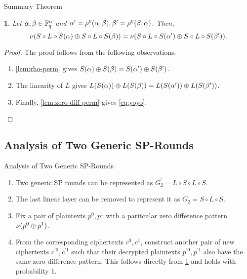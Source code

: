\documentclass[notheorems]{beamer}
\newtheorem{theorem}{\translate{Theorem}}[section]
\newtheorem{theorem}{\translate{Theorem}}
\theoremstyle{definition}
\theoremstyle{example}
\begin{document}
    \begin{frame}{Summary Theorem}
        \begin{theorem}
            \label{thm:yoyo}
            Let \(\alpha, \beta \in \mathbb F_q^n\) and \(\alpha^\prime =
            \rho^v(\alpha, \beta), \beta^\prime = \rho^v(\beta,
            \alpha)\). Then,
            \begin{equation}
                \nu(S \circ L \circ S(\alpha) \oplus S \circ L \circ S(\beta)) = \nu(S \circ L \circ S(\alpha^\prime) \oplus S \circ L \circ S(\beta^\prime)).
                \label{eq:yoyo}
            \end{equation}
        \end{theorem}
        \pause
        \begin{proof}
            The proof follows from the following observations.
            \begin{enumerate}
                \item \cref{lem:rho-perm} gives \(S(\alpha) \oplus
                S(\beta) = S(\alpha^\prime) \oplus
                S(\beta^\prime)\).
                \item The linearity of \(L\) gives \(L(S(\alpha))
                \oplus L(S(\beta)) = L(S(\alpha^\prime))
                \oplus L(S(\beta^\prime))\).
                \item Finally, \cref{lem:zero-diff-perm} gives \eqref{eq:yoyo}.
            \end{enumerate} 
        \end{proof}
    \end{frame}

    \subsection{Analysis of Two Generic SP-Rounds}
    \label{subsec:yoyo-2-rounds}

    \begin{frame}{Analysis of Two Generic SP-Rounds}
        \begin{enumerate}
            \item<1-> Two generic SP rounds can be represented as \(G_2^\prime =
            L \circ S \circ L \circ S\).
            \item<2-> The last linear layer can be removed to represent it as
            \(G_2 = S \circ L \circ S\). 
            \item<3-> Fix a pair of plaintexts \(p^0, p^1\) with a paritcular
            zero difference pattern \(\nu(p^0 \oplus p^1)\). 
            \item<4-> From the corresponding ciphertexts \(c^0, c^1\), construct
            another pair of new ciphertexts \(c^{\prime 0}, c^{\prime 1}\) such
            that their decrypted plaintexts \(p^{\prime 0}, p^{\prime 1}\) also
            have the same zero difference pattern. This follows directly from
            \cref{thm:yoyo} and holds with probability 1.
        \end{enumerate}
    \end{frame}
\end{document}
